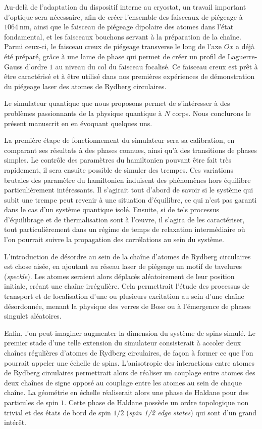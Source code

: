 Au-delà de l'adaptation du dispositif interne au cryostat, un travail important d'optique sera nécessaire, afin de créer l'ensemble des faisceaux de piégeage à $\SI{1064}{\nano\meter}$, ainsi que le faisceau de piégeage dipolaire des atomes dans l'état fondamental, et les faisceaux \og bouchons \fg{} servant à la préparation de la chaîne.
Parmi ceux-ci, le faisceau creux de piégeage transverse le long de l'axe $Ox$ a déjà été préparé, grâce à une lame de phase qui permet de créer un profil de Laguerre-Gauss d'ordre $1$ au niveau du col du faisceau focalisé.
Ce faisceau creux est prêt à être caractérisé et à être utilisé dans nos premières expériences de démonstration du piégeage laser des atomes de Rydberg circulaires.

\bigskip
Le simulateur quantique que nous proposons permet de s'intéresser à des problèmes passionnants de la physique quantique à $N$ corps.
Nous conclurons le présent manuscrit en en évoquant quelques uns.

La première étape de fonctionnement du simulateur sera sa calibration, en comparant ses résultats à des phases connues, ainsi qu'à des transitions de phases simples.
Le contrôle des paramètres du hamiltonien pouvant être fait très rapidement, il sera ensuite possible de simuler des trempes.
Ces variations brutales des paramètre du hamiltonien induisent des phénomènes hors équilibre particulièrement intéressants.
Il s'agirait tout d'abord de savoir si le système qui subit une trempe peut revenir à une situation d'équilibre, ce qui n'est pas garanti dans le cas d'un système quantique isolé.
Ensuite, si de tels processus d'équilibrage et de thermalisation sont à l'\oe uvre, il s'agira de les caractériser, tout particulièrement dans un régime de temps de relaxation intermédiaire où l'on pourrait suivre la propagation des corrélations au sein du système.

L'introduction de désordre au sein de la chaîne d'atomes de Rydberg circulaires est chose aisée, en ajoutant au réseau laser de piégeage un motif de tavelures (\textit{speckle}).
Les atomes seraient alors déplacés aléatoirement de leur position initiale, créant une chaîne irrégulière.
Cela permettrait l'étude des processus de transport et de localisation d'une ou plusieurs excitation au sein d'une chaîne désordonnée, menant la physique des verres de Bose ou à l'émergence de phases singulet aléatoires.

Enfin, l'on peut imaginer augmenter la dimension du système de spins simulé.
Le premier stade d'une telle extension du simulateur consisterait à accoler deux chaînes régulières d'atomes de Rydberg circulaires, de façon à former ce que l'on pourrait appeler une \og échelle \fg{} de spins.
L'anisotropie des interactions entre atomes de Rydberg circulaires permettrait alors de réaliser un couplage entre atomes des deux chaînes de signe opposé au couplage entre les atomes au sein de chaque chaîne.
La géométrie en échelle réaliserait alors une phase de Haldane pour des particules de spin $1$.
Cette phase de Haldane possède un ordre topologique non trivial et des états de bord de spin $1/2$ (\textit{spin 1/2 edge states}) qui sont d'un grand intérêt.

